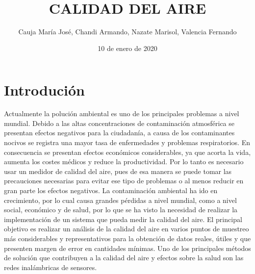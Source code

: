 \documentclass[10pt,a4paper]{article}
\begin{document}
\author{Cauja María José, Chandi Armando, Nazate Marisol, Valencia Fernando} %
\title{\textbf{CALIDAD DEL AIRE}}
\date{10 de enero de 2020}
\maketitle  

\section{Introdución}

Actualmente la polución ambiental es uno de los principales problemas a nivel mundial. Debido a las altas concentraciones de contaminación atmosférica se presentan efectos negativos para la ciudadanía, a causa de los contaminantes nocivos se registra una mayor tasa de enfermedades y problemas respiratorios. En consecuencia se presentan efectos económicos considerables, ya que acorta la vida, aumenta los costes médicos y reduce la productividad. Por lo tanto es necesario usar un medidor de calidad del aire, pues de esa manera se puede tomar las precauciones necesarias para evitar ese tipo de problemas o al menos reducir en gran parte los efectos negativos.
La contaminación ambiental ha ido en crecimiento, por lo cual causa grandes pérdidas  a nivel mundial, como a nivel social, económico y de salud, por lo que se ha visto la necesidad de realizar la implementación de un sistema que pueda medir la calidad del aire. El principal objetivo es realizar un análisis de la calidad del aire en varios puntos de muestreo más considerables y representativos para la obtención de datos reales, útiles y que presenten margen de error en cantidades mínimas. Uno de los principales métodos de solución que contribuyen a la calidad del aire y efectos sobre la salud son las redes inalámbricas de sensores.\\
\end{document}
